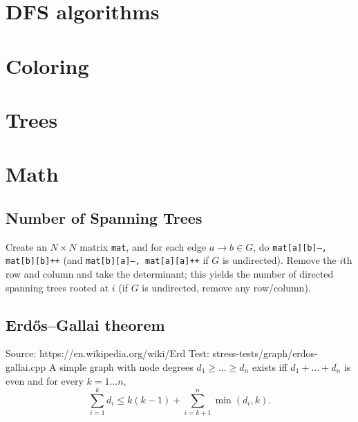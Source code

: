 \section{DFS algorithms}

\section{Coloring}


\section{Trees}

\section{Math}
	\subsection{Number of Spanning Trees}
		Create an $N\times N$ matrix \texttt{mat}, and for each edge $a \rightarrow b \in G$, do
		\texttt{mat[a][b]--, mat[b][b]++} (and \texttt{mat[b][a]--, mat[a][a]++} if $G$ is undirected).
		Remove the $i$th row and column and take the determinant; this yields the number of directed spanning trees rooted at $i$
		(if $G$ is undirected, remove any row/column).
		$$$$

	\subsection{Erdős–Gallai theorem}
		Source: https://en.wikipedia.org/wiki/Erd%
		Test: stress-tests/graph/erdos-gallai.cpp
		A simple graph with node degrees $d_1 \ge \dots \ge d_n$ exists iff $d_1 + \dots + d_n$ is even and for every $k = 1\dots n$,
		\[ \sum _{i=1}^{k}d_{i}\leq k(k-1)+\sum _{i=k+1}^{n}\min(d_{i},k). \]
